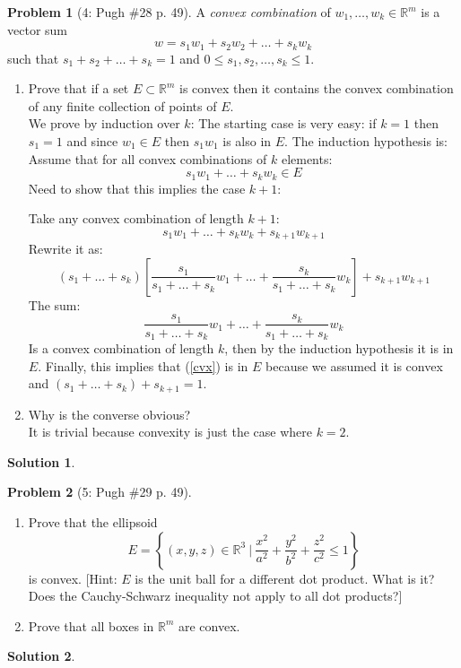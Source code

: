 \documentclass{article}
\theoremstyle{definition}
\newtheorem*{soln}{Solution}
\newtheorem*{prob}{Problem}
\theoremstyle{theorem}
\newcommand{\R}{\mathbb{R}}
\begin{document}
\begin{prob}[4: Pugh \#28 p. 49]
A \emph{convex combination} of $w_1, \ldots, w_k \in \R^m$ is a vector sum $$w = s_1 w_1 + s_2 w_2 + \ldots + s_k w_k$$ such that $s_1 + s_2 + \ldots + s_k = 1$ and $0 \leq s_1, s_2, \ldots, s_k \leq 1$.
\begin{enumerate}
    \item Prove that if a set $E \subset \R^m$ is convex then it contains the convex combination of any finite collection of points of $E$.\\
        We prove by induction over $k$: The starting case is very easy: if $k=1$ then $s_1 =1$ and since $w_1\in E$ then $s_1 w_1 $ is also in $E$.
        The induction hypothesis is: Assume that for all convex combinations of $k$ elements:
        $$s_1w_1+\ldots + s_kw_k \in E$$
        Need to show that this implies the case $k+1$: 
        
        Take any convex combination of length $k+1$:
        $$s_1w_1+\ldots + s_kw_k+ s_{k+1}w_{k+1} $$
        Rewrite it as:
        $$(s_1+\ldots + s_k)\left[ \frac{s_1}{s_1+\ldots + s_k} w_1 + \ldots + \frac{s_k}{s_1+\ldots + s_k}w_k\right]  + s_{k+1}w_{k+1}$$
        The sum:
        \begin{equation}\label{cvx} \frac{s_1}{s_1+\ldots + s_k} w_1 + \ldots + \frac{s_k}{s_1+\ldots + s_k}w_k
        \end{equation}
        Is a convex combination of length $k$, then by the induction hypothesis it is in $E$. Finally, this implies that (\ref{cvx}) is in $E$ because we assumed it is convex and $(s_1+\ldots + s_k) + s_{k+1}=1$. 

    \item Why is the converse obvious?\\
	    It is trivial because convexity is just the case where $k=2$.
\end{enumerate}
\end{prob}
\begin{soln}

\end{soln}
\vspace{1in}


\begin{prob}[5: Pugh \#29 p. 49]
\begin{enumerate}
    \item Prove that the ellipsoid $$E = \left\{ (x,y,z) \in \R^3 \ | \ \frac{x^2}{a^2} + \frac{y^2}{b^2} + \frac{z^2}{c^2} \leq 1 \right\}$$ is convex. [Hint: $E$ is the unit ball for a different dot product. What is it? Does the Cauchy-Schwarz inequality not apply to all dot products?]
    \item Prove that all boxes in $\R^m$ are convex.
\end{enumerate}
\end{prob}
\begin{soln}

\end{soln}
\vspace{1in}
\end{document}
